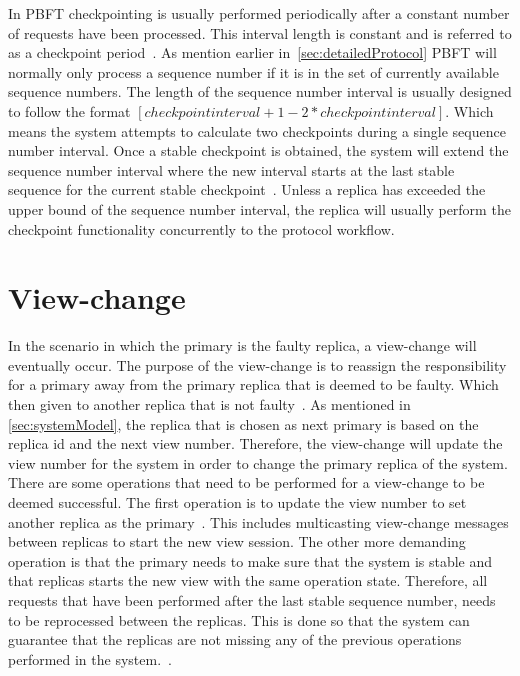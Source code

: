 In PBFT checkpointing is usually performed periodically after a constant number of requests have been processed. This interval length is constant and is referred to as a checkpoint period~\cites[p.~261]{BOOK:BuildDepDistSyst}[p.~410]{PAPER:PBFTRecovery}. As mention earlier in~\autoref{sec:detailedProtocol} PBFT will normally only process a sequence number if it is in the set of currently available sequence numbers. The length of the sequence number interval is usually designed to follow the format $[checkpointinterval+1-2*checkpointinterval]$. Which means the system attempts to calculate two checkpoints during a single sequence number interval. Once a stable checkpoint is obtained, the system will extend the sequence number interval where the new interval starts at the last stable sequence for the current stable checkpoint~\cites[p.~5]{PAPER:OGPBFT}[p.~410]{PAPER:PBFTRecovery}. Unless a replica has exceeded the upper bound of the sequence number interval, the replica will usually perform the checkpoint functionality concurrently to the protocol workflow.

\section{View-change}
\label{sec:view-change}
In the scenario in which the primary is the faulty replica, a view-change will eventually occur. The purpose of the view-change is to reassign the  responsibility for a primary away from the primary replica that is deemed to be faulty. Which then given to another replica that is not faulty~\cites[p.262]{BOOK:BuildDepDistSyst}. As mentioned in \autoref{sec:systemModel}, the replica that is chosen as next primary is based on the replica id and the next view number. Therefore, the view-change will update the view number for the system in order to change the primary replica of the system. There are some operations that need to be performed for a view-change to be deemed successful. The first operation is to update the view number to set another replica as the primary~\cites[p.~6]{PAPER:OGPBFT}[p.~411]{PAPER:PBFTRecovery}{WEB:SawtoothPBFT}. This includes multicasting view-change messages between replicas to start the new view session. The other more demanding operation is that the primary needs to make sure that the system is stable and that replicas starts the new view with the same operation state. Therefore, all requests that have been performed after the last stable sequence number, needs to be reprocessed between the replicas. This is done so that the system can guarantee that the replicas are not missing any of the previous operations performed in the system.~\cites[p.~458]{BOOK:MVstandver3}[p.~263-265]{BOOK:BuildDepDistSyst}. 

